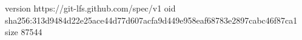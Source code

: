 version https://git-lfs.github.com/spec/v1
oid sha256:313d9484d22e25ace44d77d607acfa9d449e958eaf68783e2897cabc46f87ca1
size 87544
